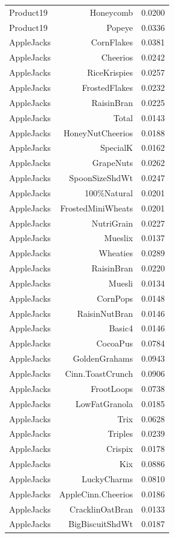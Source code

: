 \begin{longtable}{@{}lrr@{}}
Product19 & Honeycomb & 0.0200 \\
Product19 & Popeye & 0.0336 \\
AppleJacks & CornFlakes & 0.0381 \\
AppleJacks & Cheerios & 0.0242 \\
AppleJacks & RiceKrispies & 0.0257 \\
AppleJacks & FrostedFlakes & 0.0232 \\
AppleJacks & RaisinBran & 0.0225 \\
AppleJacks & Total & 0.0143 \\
AppleJacks & HoneyNutCheerios & 0.0188 \\
AppleJacks & SpecialK & 0.0162 \\
AppleJacks & GrapeNuts & 0.0262 \\
AppleJacks & SpoonSizeShdWt & 0.0247 \\
AppleJacks & 100\%Natural & 0.0201 \\
AppleJacks & FrostedMiniWheats & 0.0201 \\
AppleJacks & NutriGrain & 0.0227 \\
AppleJacks & Mueslix & 0.0137 \\
AppleJacks & Wheaties & 0.0289 \\
AppleJacks & RaisinBran & 0.0220 \\
AppleJacks & Muesli & 0.0134 \\
AppleJacks & CornPops & 0.0148 \\
AppleJacks & RaisinNutBran & 0.0146 \\
AppleJacks & Basic4 & 0.0146 \\
AppleJacks & CocoaPus & 0.0784 \\
AppleJacks & GoldenGrahams & 0.0943 \\
AppleJacks & Cinn.ToastCrunch & 0.0906 \\
AppleJacks & FrootLoops & 0.0738 \\
AppleJacks & LowFatGranola & 0.0185 \\
AppleJacks & Trix & 0.0628 \\
AppleJacks & Triples & 0.0239 \\
AppleJacks & Crispix & 0.0178 \\
AppleJacks & Kix & 0.0886 \\
AppleJacks & LuckyCharms & 0.0810 \\
AppleJacks & AppleCinn.Cheerios & 0.0186 \\
AppleJacks & CracklinOatBran & 0.0133 \\
AppleJacks & BigBiscuitShdWt & 0.0187 \\

\end{longtable}
